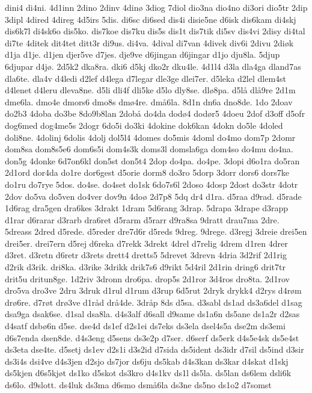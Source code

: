 dini4
di4ni.
4d1inn
2dino
2dinv
4din^^f8
3diog
7diol
dio3na
dio4no
di3ori
dio5tr
2dip
3dipl
4dired
4direg
4d5irs
5dis.
di6sc
di6sed
dis4i
disie5ne
d6isk
dis6kam
di4skj
dis6k7l
di4sk6o
dis5ko.
dis7koe
dis7ku
dis5s
dis1t
dis7tik
di5sv
dis4vi
2disy
di4tal
di7te
4ditek
dit4tet
ditt3r
di9us.
di4va.
4dival
di7van
4divek
div6i
2divu
2di^^f8k
d1ja
d1je.
d1jen
djer5ve
d7jes.
dje9ve
d6jingan
d6jingar
d1jo
dju8la.
5djup
6djupar
d4j^^f8.
2d5k2
dka8ra.
dki6
d5kj
dko2r
dku4le.
4d1l4
d3la
dla4ga
dland7as
dla6te.
dla4v
d4ledi
d2lef
d4lega
d7legar
dle3ge
dlei7er.
d5leka
d2lel
dlem4st
d4lenet
d4leru
dleva8ne.
d5li
dli4f
dli5ke
d5lo
dly8se.
dl^^f88pa.
d5l^^e5
dl^^e59re
2d1m
dme6la.
dmo4e
dmors6
dmo8s
dm^^f84re.
dm^^e56la.
8d1n
dn6a
dno8de.
1do
2doav
do2b3
4doba
do3be
8do9b8lan
2dob^^e5
do4da
dod^^f84
dod^^f8r5
4doeu
2dof
d3off
d5ofr
dog6med
dog4me5s
2dogr
6do5i
do3ki
4dokine
dok6kan
4dokn
do5le
4doled
doli8ne.
4dolinj
6dolis
4dolj
dol5l4
4domes
do5mis
4doml
do4mo
dom7p
2domr
dom8sa
dom8s5e6
dom6s5i
dom4s3k
doms3l
domsla6ga
dom4so
do4mu
do4na.
don5g
4donke
6d7on6kl
don5st
don5t4
2dop
do4pa.
do4pe.
3dopi
d6o1ra
do5ran
2d1ord
dor4da
do1re
dor6gest
d5orie
dorm8
do3ro
5dorp
3dorr
dors6
dors7ke
do1ru
do7rye
5dos.
do4se.
do4set
do1sk
6do7s6l
2doso
4dosp
2dost
do3str
4dotr
2dov
do5va
do5ven
do4ver
dov9n
4do^^f8
2d7p8
5dq
dr4
d1ra.
d5raa
d9rad.
d5rade
1d6rag
dra5gen
dra6kes
3drakt
1dram
5d6rang
3drap.
5drapa
3drape
d3rapp
d1rar
d6rarar
d3rarb
dra6ret
d5rarm
d5rarr
d9ra8sa
9dratt
drau7ma
2dre.
5dreass
2dred
d5rede.
d5reder
dre7d6r
d5reds
9dreg.
9drege.
d3regj
3dreie
drei5en
drei5er.
drei7ern
d5rej
d6reka
d7rekk
3drekt
4drel
d7relig
4drem
d1ren
4drer
d3ret.
d3retn
d6retr
d3rets
drett4
dretts5
5drevet
3drevn
4dria
3d2rif
2d1rig
d2rik
d3rik.
dri8ka.
d3rike
3drikk
drik7s6
d9rikt
5d4ril
2d1rin
dring6
drit7tr
drit5u
dritun8ge.
1d2riv
3dronn
dro6pa.
drop5s
2d1ror
3d4ros
dro8ta.
2d1rov
dro5va
dro3ve
2dru
3druk
d1rul
d1rum
d3rup
6d5rut
2dryk
drykk4
d2rys
d4r^^f8m
dr^^f86re.
d7r^^f8t
dr^^f83ve
d1r^^e5d
dr^^e54de.
3dr^^e5p
8ds
d5sa.
d3sabl
ds1ad
ds3a6del
d1sag
dsa9ga
dsak6se.
d1sal
dsa8la.
d4s3alf
d6sall
d9same
ds1a6n
ds5ane
ds1a2r
d2sas
d4satf
dsb^^f86n
d5se.
dse4d
ds1ef
d2s1ei
ds7eks
ds3ela
dsel4s5a
dse2m
ds3emi
d6s7enda
dsen8de.
d4s3eng
d5sens
ds3e2p
d7ser.
d6serf
ds5erk
d4s5e4sk
ds5e4st
ds3eta
dse4te.
d5setj
ds1ev
d2s1i
d3s2id
d7sida
ds5ident
ds3idr
d7sil
ds5ind
d3sir
ds3i4s
dsi4ve
d4s3jen
d2sjo
ds7jor
ds6ju
ds5kab
d4s3kan
ds3kar
d4skat
d1skj
ds5kjen
d6s5kj^^f8t
ds1ko
d5skot
ds3kro
d4s1kv
ds1l
ds5la.
ds5lan
ds6lem
dsli6k
ds6lo.
d9slott.
ds4luk
ds3ma
d6smo
dsm^^e56la
ds3ne
ds5no
ds1o2
d7somst
